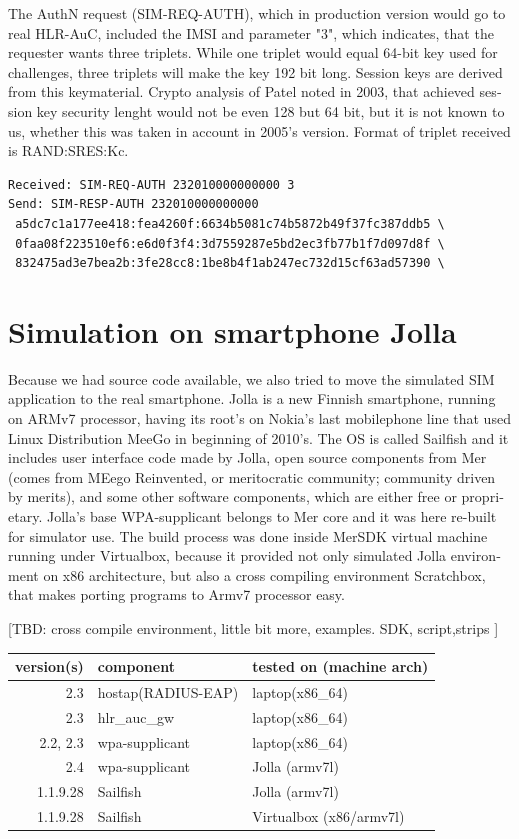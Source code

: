 \documentclass[12pt,a4paper,english]{tutthesis}
\begin{document}
\begin{otherlanguage}{english}
The AuthN request (SIM-REQ-AUTH), which in production version would go
to real HLR-AuC, included the IMSI and parameter "3", which indicates,
that the requester wants three triplets.  
While one triplet would equal 64-bit key used for challenges, three
triplets will make the key 192 bit long. Session keys are derived from
this keymaterial. Crypto analysis of Patel\cite{patel-sim} noted in
2003, that achieved session key security lenght would not be even 128
but 64 bit, but it is not known to us, whether this was taken in
account in 2005's version. 
Format of triplet received is RAND:SRES:Kc.

\scriptsize
\begin{verbatim}
Received: SIM-REQ-AUTH 232010000000000 3
Send: SIM-RESP-AUTH 232010000000000 
 a5dc7c1a177ee418:fea4260f:6634b5081c74b5872b49f37fc387ddb5 \
 0faa08f223510ef6:e6d0f3f4:3d7559287e5bd2ec3fb77b1f7d097d8f \
 832475ad3e7bea2b:3fe28cc8:1be8b4f1ab247ec732d15cf63ad57390 \
\end{verbatim}
\normalsize


\section{Simulation on smartphone Jolla}
\label{sec-5-3}

Because we had source code available, we also tried to move the
simulated SIM application to the real smartphone.  Jolla is a new
Finnish smartphone, running on ARMv7 processor, having its root's on
Nokia's last mobilephone line that used Linux Distribution MeeGo in
beginning of 2010's.  The OS is called Sailfish and it includes user
interface code made by Jolla, open source components from Mer (comes
from MEego
Reinvented, or meritocratic community; community driven by merits), and some other software
components, which are either free or proprietary.  Jolla's base
WPA-supplicant belongs to Mer core and it was here re-built for
simulator use. The build process was done inside MerSDK virtual
machine running under Virtualbox, because it provided not only
simulated Jolla environment on x86 architecture, but also a cross
compiling environment Scratchbox, that makes porting programs to Armv7
processor easy.

[TBD: cross compile environment, little bit more, examples. SDK,
script,strips ]


\begin{center}
\begin{tabular}{rll}
version(s) & component & tested on (machine arch)\\
\hline
2.3 & hostap(RADIUS-EAP) & laptop(x86\_64)\\
2.3 & hlr\_auc\_gw & laptop(x86\_64)\\
2.2, 2.3 & wpa-supplicant & laptop(x86\_64)\\
2.4 & wpa-supplicant & Jolla (armv7l)\\
1.1.9.28 & Sailfish & Jolla (armv7l)\\
1.1.9.28 & Sailfish & Virtualbox (x86/armv7l)\\
\end{tabular}
\end{center}




\end{otherlanguage}
\end{document}
